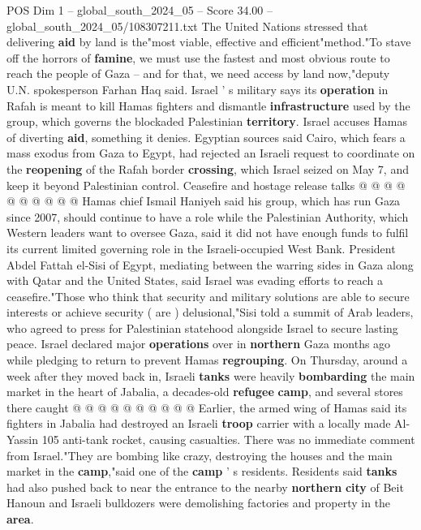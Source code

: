 \begin{textsample}{POS Dim 1 – global\_south\_2024\_05 – Score 34.00 – global\_south\_2024\_05/108307211.txt}
The United Nations stressed that delivering \textbf{aid} by land is the"most viable, effective and efficient"method."To stave off the horrors of \textbf{famine}, we must use the fastest and most obvious route to reach the people of Gaza -- and for that, we need access by land now,"deputy U.N. spokesperson Farhan Haq said.
Israel ' s military says its \textbf{operation} in Rafah is meant to kill Hamas fighters and dismantle \textbf{infrastructure} used by the group, which governs the blockaded Palestinian \textbf{territory}.
Israel accuses Hamas of diverting \textbf{aid}, something it denies.
Egyptian sources said Cairo, which fears a mass exodus from Gaza to Egypt, had rejected an Israeli request to coordinate on the \textbf{reopening} of the Rafah border \textbf{crossing}, which Israel seized on May 7, and keep it beyond Palestinian control.
Ceasefire and hostage release talks @ @ @ @ @ @ @ @ @ @ Hamas chief Ismail Haniyeh said his group, which has run Gaza since 2007, should continue to have a role while the Palestinian Authority, which Western leaders want to oversee Gaza, said it did not have enough funds to fulfil its current limited governing role in the Israeli-occupied West Bank.
President Abdel Fattah el-Sisi of Egypt, mediating between the warring sides in Gaza along with Qatar and the United States, said Israel was evading efforts to reach a ceasefire."Those who think that security and military solutions are able to secure interests or achieve security ( are ) delusional,"Sisi told a summit of Arab leaders, who agreed to press for Palestinian statehood alongside Israel to secure lasting peace.
Israel declared major \textbf{operations} over in \textbf{northern} Gaza months ago while pledging to return to prevent Hamas \textbf{regrouping}.
On Thursday, around a week after they moved back in, Israeli \textbf{tanks} were heavily \textbf{bombarding} the main market in the heart of Jabalia, a decades-old \textbf{refugee} \textbf{camp}, and several stores there caught @ @ @ @ @ @ @ @ @ @ Earlier, the armed wing of Hamas said its fighters in Jabalia had destroyed an Israeli \textbf{troop} carrier with a locally made Al-Yassin 105 anti-tank rocket, causing casualties.
There was no immediate comment from Israel."They are bombing like crazy, destroying the houses and the main market in the \textbf{camp},"said one of the \textbf{camp} ' s residents.
Residents said \textbf{tanks} had also pushed back to near the entrance to the nearby \textbf{northern} \textbf{city} of Beit Hanoun and Israeli bulldozers were demolishing factories and property in the \textbf{area}.

\end{textsample}
